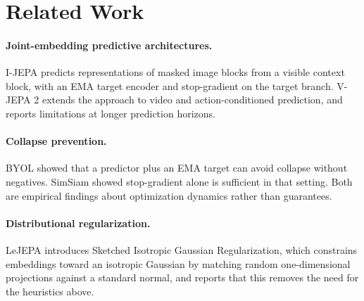 \section{Related Work}

\paragraph{Joint-embedding predictive architectures.} I-JEPA
\citep{assran2023ijepa} predicts representations of masked image blocks from a visible
context block, with an EMA target encoder and stop-gradient on the target branch. V-JEPA 2
\citep{vjepa2_2025} extends the approach to video and action-conditioned prediction, and
reports limitations at longer prediction horizons.

\paragraph{Collapse prevention.} BYOL \citep{grill2020byol} showed that a predictor plus an
EMA target can avoid collapse without negatives. SimSiam \citep{chen2021simsiam} showed
stop-gradient alone is sufficient in that setting. Both are empirical findings about
optimization dynamics rather than guarantees.

\paragraph{Distributional regularization.} LeJEPA \citep{lejepa2025} introduces Sketched
Isotropic Gaussian Regularization, which constrains embeddings toward an isotropic Gaussian
by matching random one-dimensional projections against a standard normal, and reports that
this removes the need for the heuristics above.
